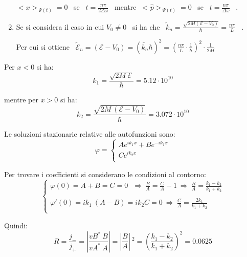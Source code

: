\documentclass[12pt,twoside,a4]{article}
\begin{document}
\begin{solution}
\begin{enumerate}[label=(\textit{\roman*})]
\medskip
$< x > _{ \ \Psi(t)} = 0 $ \ se \ $t = \frac{n \pi}{2 \Delta\omega }$ \ mentre \  < $\hat{p} > _{ \ \Psi(t)} = 0 $ \ se \ $t = \frac{n \pi}{ \Delta\omega }$ \ . 

\item Se si considera il caso in cui $V_0 \not = 0$ \ si ha che \ $ \tilde{k}_n = \frac{\sqrt{2 M (\mathcal{E} - V_0)}}{\hbar} = \frac{n \pi}{L}$ \ . 

Per cui si ottiene \ $\mathcal{\tilde{E}}_n = (\mathcal{E}-V_0) = (\tilde{k_n} \hbar )^2= \left(\frac{n \pi}{L} \cdot  \frac{1}{\hbar} \right)^2 \cdot \frac{1}{2M} $
\end{enumerate}
\end{solution}


\begin{solution}
Per $x < 0$ si ha: \begin{equation*}
 k_1 = \frac{\sqrt{2 M \ \mathcal{E}}}{\hbar} =  5.12 \cdot 10^{10}  
\end{equation*}

mentre per $x > 0$ si ha: \begin{equation*}
k_2 = \frac{\sqrt{2M \ (\mathcal{E} - V_0)}}{\hbar} = 3.072 \cdot 10^{10}    
\end{equation*}

Le soluzioni stazionarie relative alle autofunzioni sono: \begin{equation*}
 \varphi = \begin{cases}
     A e^{ik_1 x} + B e ^{-ik_1 x} \\
      C e^{ik_2 x}\\
 \end{cases}    
\end{equation*}

Per trovare i coefficienti si considerano le condizioni al contorno:\begin{equation*}
\begin{cases} 
\varphi(0) =  A + B = C = 0  \   \   \  \Rightarrow  \  \frac{B}{A} = \frac{C}{A} -1  \  \Rightarrow  \  \frac{B}{A} = \frac{k_1 - k_2}{k_1 + k_2} \\
\\
\varphi'(0) = ik_1 \ (A - B) = i k_2 C = 0  \  \Rightarrow  \  \frac{C}{A} = \frac{2 k_1}{k_1 +k_2} \\
\end{cases} 
\end{equation*}

Quindi: \begin{equation*}
 R = \frac{j_-}{j_+} =\left| \frac{v B^\ast \ B}{v A^\ast \ A} \right|= \left| \frac{B}{A}\right| \ ^2 = \left(\frac{k_1 - k_2}{k_1 + k_2}\right)^2 = 0.0625  
\end{equation*}
\end{solution}
\end{document}

